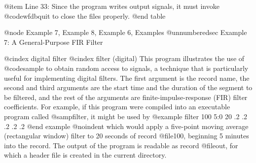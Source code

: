 {{{{{{{{{@item Line 33:
Since the program writes output signals, it must invoke @code{wfdbquit} to
close the files properly.
@end table

@node     Example 7, Example 8, Example 6, Examples
@unnumberedsec Example 7: A General-Purpose FIR Filter

@cindex digital filter
@cindex filter (digital)
This program illustrates the use of @code{sample} to obtain random
access to signals, a technique that is particularly
useful for implementing digital filters.  The first argument is the
record name, the second and third arguments are the start time and the
duration of the segment to be filtered, and the rest of the arguments
are finite-impulse-response (FIR) filter coefficients.  For example, if
this program were compiled into an executable program called
@samp{filter}, it might be used by
@example
filter 100 5:0 20 .2 .2 .2 .2 .2
@end example
@noindent
which would apply a five-point moving average (rectangular window) filter
to 20 seconds of record @file{100}, beginning 5 minutes into the record.
The output of the program is readable as record @file{out}, for which a
header file is created in the current directory.

}}}}}}}}}
